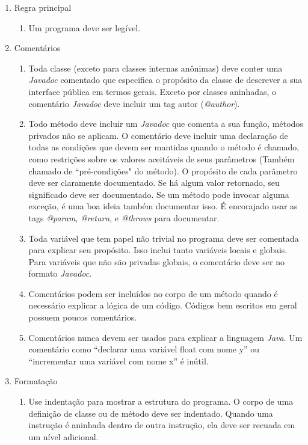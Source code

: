 \documentclass[conference]{IEEEtran}
\begin{document}
\begin{enumerate}
\item Regra principal
\begin{enumerate}
\item Um programa deve ser legível.
\end{enumerate}
\item Comentários
\begin{enumerate}
\item Toda classe (exceto para classes internas anônimas) deve conter uma \textit{Javadoc} comentado que especifica o propósito da classe de descrever a sua interface pública em termos gerais. Exceto por classes aninhadas, o comentário \textit{Javadoc} deve incluir um tag autor (\textit{@author}).
\item Todo método deve incluir um \textit{Javadoc} que comenta a sua função, métodos privados não se aplicam. O comentário deve incluir uma declaração de todas as condições que devem ser mantidas quando o método é chamado, como restrições sobre os valores aceitáveis de seus parâmetros (Também chamado de “pré-condições" do método). O propósito de cada parâmetro deve ser claramente documentado. Se há algum valor retornado, seu significado deve ser documentado. Se um método pode invocar alguma exceção, é uma boa ideia também documentar isso. É encorajado usar as tags \textit{@param}, \textit{@return}, e \textit{@throws} para documentar.
\item Toda variável que tem papel não trivial no programa deve ser comentada para explicar seu propósito. Isso inclui tanto variáveis locais e globais. Para variáveis que não são privadas globais, o comentário deve ser no formato \textit{Javadoc}.
\item Comentários podem ser incluídos no corpo de um método quando é necessário explicar a lógica de um código. Códigos bem escritos em geral possuem poucos comentários.
\item Comentários nunca devem ser usados para explicar a linguagem \textit{Java}. Um comentário como “declarar uma variável float com nome y” ou “incrementar uma variável com nome x” é inútil.
\end{enumerate}
\item Formatação
\begin{enumerate}
\item Use indentação para mostrar a estrutura do programa. O corpo de uma definição de classe ou de método deve ser indentado. Quando uma instrução é aninhada dentro de outra instrução, ela deve ser recuada em um nível adicional.

\end{enumerate}
\end{enumerate}
\end{document}
